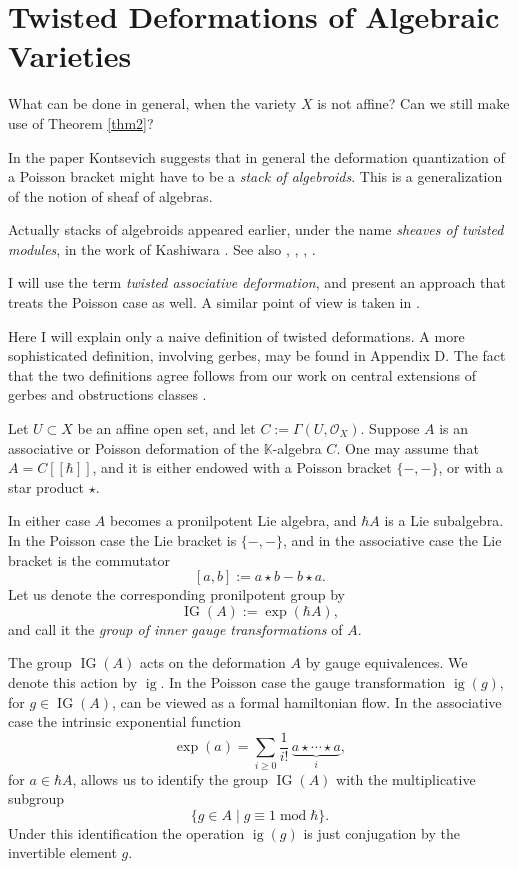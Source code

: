 \documentclass{conm-p-l}
\theoremstyle{definition}
\numberwithin{equation}{section}
\newcommand{\opn}{\operatorname}
\newcommand{\mcal}[1]{\mathcal{#1}}
\newcommand{\mbb}[1]{\mathbb{#1}}
\newcommand{\K}{\mbb{K}}
\newcommand{\smfrac}[2]{\textstyle \frac{#1}{#2}}
\begin{document}
\section{Twisted Deformations of Algebraic Varieties}
\label{sec:twdefs}

What can be done in general, when the variety $X$ is not affine? Can
we still make use of Theorem \ref{thm2}? 

In the paper \cite{Ko3} Kontsevich suggests that in general the 
deformation quantization of a Poisson bracket might have to be a 
{\em stack of algebroids}. This is a generalization of
the notion of sheaf of algebras. 

Actually stacks of algebroids appeared earlier, 
under the name {\em sheaves of twisted modules},
in the work of Kashiwara \cite{Ka}. See also \cite{DP}, \cite{PS},
\cite{KS1}, \cite{KS2}. 

I will use the term {\em twisted associative deformation},
and present an approach that treats the Poisson case as well. 
A similar point of view is taken in \cite{BGNT}. 

Here I will explain only a naive definition of twisted 
deformations. A more sophisticated definition, involving gerbes, 
may be found in Appendix D.
The fact that the two definitions agree follows from our work on
central extensions of gerbes and obstructions classes \cite{Ye5}.

Let $U \subset X$ be an affine open set, and let
$C := \Gamma(U, \mcal{O}_X)$. 
Suppose $A$ is an associative or Poisson deformation of the
$\K$-algebra $C$.
One may assume that 
$A = C[[\hbar]]$, and it is either endowed with a Poisson bracket
$\{ -,- \}$, or with a star product $\star$.  

In either case $A$ becomes a pronilpotent Lie algebra, and 
$\hbar A$ is a Lie subalgebra. In the Poisson
case the Lie bracket is $\{ -,- \}$, and in the associative case the
Lie bracket is the commutator
\[ [a,b] := a \star b - b \star a . \]
Let us denote the corresponding pronilpotent group by
\[ \opn{IG}(A) := \opn{exp}(\hbar A) , \]
and call it the {\em group of inner gauge transformations}
of $A$.

The group $\opn{IG}(A)$ acts on the deformation $A$ by gauge
equivalences. We denote this action by $\opn{ig}$. 
In the Poisson case the gauge
transformation $\opn{ig}(g)$, for $g \in \opn{IG}(A)$,
can be viewed as a formal hamiltonian flow. 
In the associative case the intrinsic exponential function
\[ \exp(a) =  \sum_{i \geq 0} \smfrac{1}{i!} \,
\underset{i}{\underbrace{ a \star \cdots \star a }} , \] 
for $a \in \hbar A$, allows us to identify the group $\opn{IG}(A)$
with the multiplicative subgroup 
\[ \{ g \in A \mid g \equiv 1 \opn{mod} \hbar \} . \]
Under this identification the operation $\opn{ig}(g)$ is just
conjugation by the invertible element $g$. 
\end{document}
